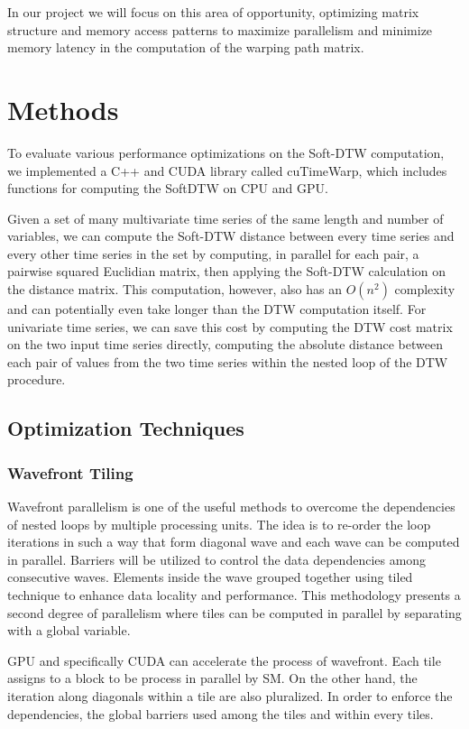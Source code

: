 \documentclass[12pt, letterpaper]{article}
\begin{document}
In our project we will focus on this area of opportunity, optimizing matrix
structure and memory access patterns to maximize parallelism and minimize memory
latency in the computation of the warping path matrix.

\section{Methods}

To evaluate various performance optimizations on the Soft-DTW computation, we
implemented a C++ and CUDA library called cuTimeWarp, which includes functions
for computing the SoftDTW on CPU and GPU.

Given a set of many multivariate time series of the same length and number of
variables, we can compute the Soft-DTW distance between every time series and
every other time series in the set by computing, in parallel for each pair, a
pairwise squared Euclidian matrix, then applying the Soft-DTW calculation on the
distance matrix. This computation, however, also has an $O(n^2)$ complexity and
can potentially even take longer than the DTW computation itself. For univariate
time series, we can save this cost by computing the DTW cost matrix on the two
input time series directly, computing the absolute distance between each pair of
values from the two time series within the nested loop of the DTW procedure.

\subsection{Optimization Techniques}

\subsubsection{Wavefront Tiling}
Wavefront parallelism is one of the useful methods to overcome the dependencies
of nested loops by multiple processing units. The idea is to re-order the loop
iterations in such a way that form diagonal wave and each wave can be computed
in parallel. Barriers will be utilized to control the data dependencies among
consecutive waves. Elements inside the wave grouped together using tiled
technique to enhance data locality and performance. This methodology presents a
second degree of parallelism where tiles can be computed in parallel by
separating with a global variable.

GPU and specifically CUDA can accelerate the process of wavefront. Each tile
assigns to a block to be process in parallel by SM. On the other hand, the
iteration along diagonals within a tile are also pluralized. In order to enforce
the dependencies, the global barriers used among the tiles and within every
tiles.\cite{belviranli_peerwave_2015}
\end{document}
